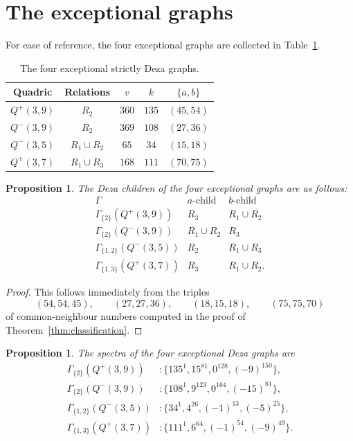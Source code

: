 \documentclass{article}
\theoremstyle{plain}
\newtheorem{prop}[thm]{Proposition}
\begin{document}
\section{The exceptional graphs}\label{sec:identifications}

For ease of reference, the four exceptional graphs are collected in
Table~\ref{tab:exceptional}.

\begin{table}[ht]
\centering
\begin{tabular}{ccccc}
\hline
Quadric & Relations & $v$ & $k$ & $\{a,b\}$\\
\hline
$Q^+(3,9)$ & $R_2$         & $360$ & $135$ & $(45,54)$\\
$Q^-(3,9)$ & $R_2$         & $369$ & $108$ & $(27,36)$\\
$Q^-(3,5)$ & $R_1\cup R_2$ & $65$  & $34$  & $(15,18)$\\
$Q^+(3,7)$ & $R_1\cup R_3$ & $168$ & $111$ & $(70,75)$\\
\hline
\end{tabular}
\caption{The four exceptional strictly Deza graphs.}
\label{tab:exceptional}
\end{table}

\begin{prop}
The Deza children of the four exceptional graphs are as follows:
\[
\begin{array}{c|c|c}
\Gamma & a\text{-child} & b\text{-child}\\
\hline
\Gamma_{\{2\}}(Q^+(3,9))
    & R_3 & R_1\cup R_2\\
\Gamma_{\{2\}}(Q^-(3,9))
    & R_1\cup R_2 & R_3\\
\Gamma_{\{1,2\}}(Q^-(3,5))
    & R_2 & R_1\cup R_3\\
\Gamma_{\{1,3\}}(Q^+(3,7))
    & R_3 & R_1\cup R_2.
\end{array}
\]
\end{prop}

\begin{proof}
This follows immediately from the triples
\[
(54,54,45),\qquad
(27,27,36),\qquad
(18,15,18),\qquad
(75,75,70)
\]
of common-neighbour numbers computed in the proof of
Theorem~\ref{thm:classification}.
\end{proof}

\begin{prop}
The spectra of the four exceptional Deza graphs are
\[
\begin{aligned}
\Gamma_{\{2\}}(Q^+(3,9))
 &
 :\{135^1,15^{81},0^{128},(-9)^{150}\},\\
\Gamma_{\{2\}}(Q^-(3,9))
 &:
 \{108^1,9^{123},0^{164},(-15)^{81}\},\\
\Gamma_{\{1,2\}}(Q^-(3,5))
 &:
 \{34^1,4^{26},(-1)^{13},(-5)^{25}\},\\
\Gamma_{\{1,3\}}(Q^+(3,7))
 &:
 \{111^1,6^{64},(-1)^{54},(-9)^{49}\}.
\end{aligned}
\]
\end{prop}
\end{document}
